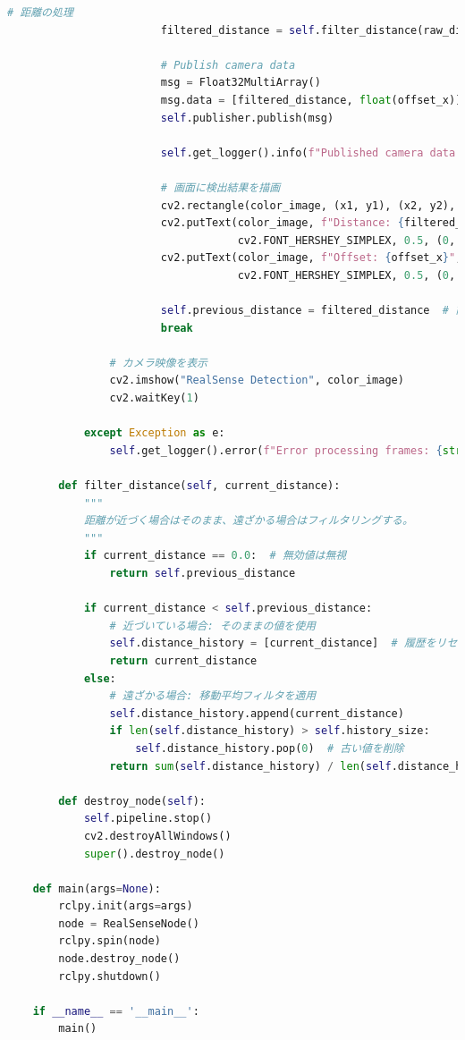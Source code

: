 \begin{lstlisting}[language=Python, caption=RealSense\_node.py]
                        # 距離の処理
                        filtered_distance = self.filter_distance(raw_distance)
    
                        # Publish camera data
                        msg = Float32MultiArray()
                        msg.data = [filtered_distance, float(offset_x)]
                        self.publisher.publish(msg)
    
                        self.get_logger().info(f"Published camera data: Distance={filtered_distance:.2f}, Offset={offset_x}")
    
                        # 画面に検出結果を描画
                        cv2.rectangle(color_image, (x1, y1), (x2, y2), (0, 255, 0), 2)
                        cv2.putText(color_image, f"Distance: {filtered_distance:.2f}m", (x1, y1 - 10),
                                    cv2.FONT_HERSHEY_SIMPLEX, 0.5, (0, 255, 0), 2)
                        cv2.putText(color_image, f"Offset: {offset_x}", (x1, y1 - 30),
                                    cv2.FONT_HERSHEY_SIMPLEX, 0.5, (0, 255, 0), 2)
    
                        self.previous_distance = filtered_distance  # 前回の距離を更新
                        break
    
                # カメラ映像を表示
                cv2.imshow("RealSense Detection", color_image)
                cv2.waitKey(1)
    
            except Exception as e:
                self.get_logger().error(f"Error processing frames: {str(e)}")
    
        def filter_distance(self, current_distance):
            """
            距離が近づく場合はそのまま、遠ざかる場合はフィルタリングする。
            """
            if current_distance == 0.0:  # 無効値は無視
                return self.previous_distance
    
            if current_distance < self.previous_distance:
                # 近づいている場合: そのままの値を使用
                self.distance_history = [current_distance]  # 履歴をリセット
                return current_distance
            else:
                # 遠ざかる場合: 移動平均フィルタを適用
                self.distance_history.append(current_distance)
                if len(self.distance_history) > self.history_size:
                    self.distance_history.pop(0)  # 古い値を削除
                return sum(self.distance_history) / len(self.distance_history)
    
        def destroy_node(self):
            self.pipeline.stop()
            cv2.destroyAllWindows()
            super().destroy_node()
    
    def main(args=None):
        rclpy.init(args=args)
        node = RealSenseNode()
        rclpy.spin(node)
        node.destroy_node()
        rclpy.shutdown()
    
    if __name__ == '__main__':
        main()
\end{lstlisting}

